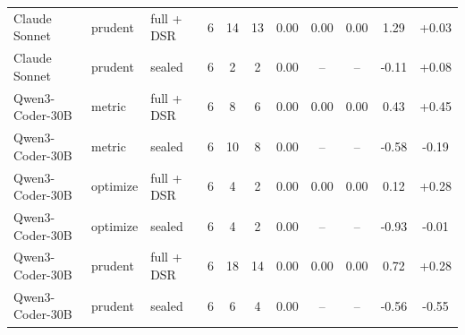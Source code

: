 \begin{table}[t]
{\begin{tabular}{lll c cc ccc cc}
\addlinespace
Claude Sonnet & prudent & full + DSR & 6 & 14 & 13 & 0.00 & 0.00 & 0.00 & 1.29 & +0.03\\
Claude Sonnet & prudent & sealed & 6 & 2 & 2 & 0.00 & -- & -- & -0.11 & +0.08\\
\midrule
Qwen3-Coder-30B & metric & full + DSR & 6 & 8 & 6 & 0.00 & 0.00 & 0.00 & 0.43 & +0.45\\
Qwen3-Coder-30B & metric & sealed & 6 & 10 & 8 & 0.00 & -- & -- & -0.58 & -0.19\\
\addlinespace
Qwen3-Coder-30B & optimize & full + DSR & 6 & 4 & 2 & 0.00 & 0.00 & 0.00 & 0.12 & +0.28\\
Qwen3-Coder-30B & optimize & sealed & 6 & 4 & 2 & 0.00 & -- & -- & -0.93 & -0.01\\
\addlinespace
Qwen3-Coder-30B & prudent & full + DSR & 6 & 18 & 14 & 0.00 & 0.00 & 0.00 & 0.72 & +0.28\\
Qwen3-Coder-30B & prudent & sealed & 6 & 6 & 4 & 0.00 & -- & -- & -0.56 & -0.55\\
\bottomrule\end{tabular}}\end{table}
